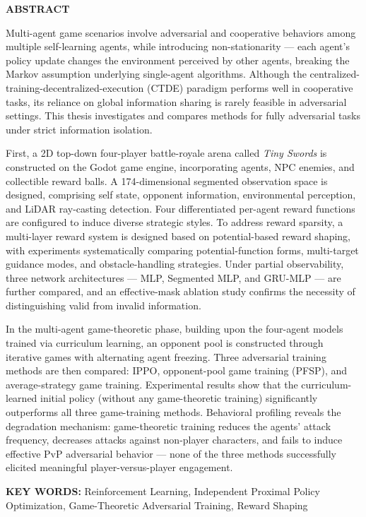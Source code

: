 \documentclass[12pt, a4paper, UTF8]{ctexart}
\makeatletter
\numberwithin{equation}{section}
\newenvironment{enabstract}[1]{
  \def\@enkeywords{#1}
  \clearpage
  \begin{center}
    {\zihao{-2}\bfseries ABSTRACT}
  \end{center}
  \addcontentsline{toc}{section}{ABSTRACT}
  \vspace{1\baselineskip}
  \zihao{-4}\rmfamily
  \setlength{\parindent}{2em}   %
  \setstretch{1.438}  %
}{
  \par\vspace{1\baselineskip}
  \noindent\textbf{KEY WORDS: }\@enkeywords
  \clearpage
}
\makeatother
\begin{document}
\begin{enabstract}{Reinforcement Learning, Independent Proximal Policy Optimization, Game-Theoretic Adversarial Training, Reward Shaping}

Multi-agent game scenarios involve adversarial and cooperative behaviors among multiple self-learning agents, while introducing non-stationarity --- each agent's policy update changes the environment perceived by other agents, breaking the Markov assumption underlying single-agent algorithms. Although the centralized-training-decentralized-execution (CTDE) paradigm performs well in cooperative tasks, its reliance on global information sharing is rarely feasible in adversarial settings. This thesis investigates and compares methods for fully adversarial tasks under strict information isolation.

First, a 2D top-down four-player battle-royale arena called \textit{Tiny Swords} is constructed on the Godot game engine, incorporating agents, NPC enemies, and collectible reward balls. A 174-dimensional segmented observation space is designed, comprising self state, opponent information, environmental perception, and LiDAR ray-casting detection. Four differentiated per-agent reward functions are configured to induce diverse strategic styles. To address reward sparsity, a multi-layer reward system is designed based on potential-based reward shaping, with experiments systematically comparing potential-function forms, multi-target guidance modes, and obstacle-handling strategies. Under partial observability, three network architectures --- MLP, Segmented MLP, and GRU-MLP --- are further compared, and an effective-mask ablation study confirms the necessity of distinguishing valid from invalid information.

In the multi-agent game-theoretic phase, building upon the four-agent models trained via curriculum learning, an opponent pool is constructed through iterative games with alternating agent freezing. Three adversarial training methods are then compared: IPPO, opponent-pool game training (PFSP), and average-strategy game training. Experimental results show that the curriculum-learned initial policy (without any game-theoretic training) significantly outperforms all three game-training methods. Behavioral profiling reveals the degradation mechanism: game-theoretic training reduces the agents' attack frequency, decreases attacks against non-player characters, and fails to induce effective PvP adversarial behavior --- none of the three methods successfully elicited meaningful player-versus-player engagement.


\end{enabstract}
\end{document}
